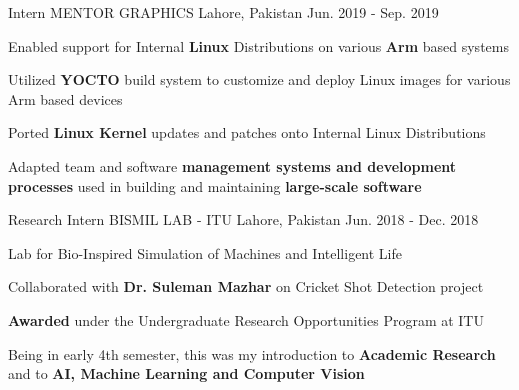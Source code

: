 \begin{cventries}
  \cventry
    {Intern} %
    {MENTOR GRAPHICS} %
    {Lahore, Pakistan} %
    {Jun. 2019 - Sep. 2019} %
    {
      \begin{cvitems} %
        \item Enabled support for Internal \textbf{Linux} Distributions on various \textbf{Arm }based systems
        \item Utilized \textbf{YOCTO} build system to customize and deploy Linux images for various Arm based devices
        \item Ported \textbf{Linux Kernel} updates and patches onto Internal Linux Distributions
        \item Adapted team and software \textbf{management systems and development processes} used in building and maintaining \textbf{large-scale software}
      \end{cvitems}
    }

  \cventry
    {Research Intern} %
    {BISMIL LAB - ITU} %
    {Lahore, Pakistan} %
    {Jun. 2018 - Dec. 2018} %
    {}

    \cventry
    {Lab for Bio-Inspired Simulation of Machines and Intelligent Life} %
    {} %
    {} %
    {} %
    {
      \begin{cvitems} %
        \item Collaborated with \textbf{Dr. Suleman Mazhar} on Cricket Shot Detection project
        \item \textbf{Awarded} under the Undergraduate Research Opportunities Program at ITU
        \item Being in early 4th semester, this was my introduction to \textbf{Academic Research} and to \textbf{AI, Machine Learning and Computer Vision}
      \end{cvitems}
    }

\end{cventries}
